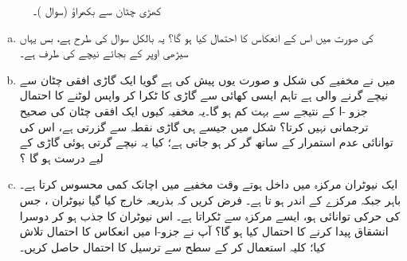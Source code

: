 \begin{figure}
\centering
{}
\caption{کھڑی چٹان سے بکھراؤ (سوال )۔}
\label{شکل_غیر_تابع_شروڈنگر_عمودی_چٹان_بکھراو}
\end{figure}
%
\begin{enumerate}[a.]
\item
{} کی صورت  میں اس کے انعکاس کا احتمال کیا ہو گا؟  یہ بالکل سوال  کی طرح ہے، بس یہاں سیڑھی اوپر کے بجائے نیچے  کی طرف  ہے۔
\item 
 میں نے مخفیے  کی شکل و صورت یوں پیش کی ہے گویا ایک گاڑی افقی چٹان سے نیچے گرنے والی ہے تاہم ایسی کھائی سے گاڑی کا ٹکرا کر واپس لوٹنے کا احتمال جزو -ا کے نتیجے سے بہت کم ہو گا۔یہ مخفیہ کیوں ایک افقی چٹان کی صحیح ترجمانی نہیں کرتا؟   شکل  میں جیسے ہی گاڑی نقطہ    سے گزرتی ہے، اس کی توانائی عدم استمرار کے ساتھ گر کر   ہو جاتی ہے؛ کیا یہ نیچے گرتی  ہوئی گاڑی کے لیے درست ہو گا ؟
\item
ایک نیوٹران مرکزہ میں داخل ہوتے  وقت  مخفیے میں اچانک کمی محسوس کرتا ہے۔ باہر  جبکہ مرکزے کے اندر   ہو تا ہے۔ فرض کریں  کہ بذریعہ  خارج کیا گیا   نیوٹران ، جس کی حرکی توانائی  ہو،  ایسے مرکزہ سے ٹکراتا ہے۔ اس نیوٹران کا جذب ہو کر دوسرا انشقاق پیدا کرنے کا احتمال کیا ہو گا؟  آپ نے جزو-ا میں انعکاس کا احتمال تلاش کیا؛ کلیہ    استعمال کر کے سطح سے ترسیل کا احتمال حاصل کریں۔
\end{enumerate}

